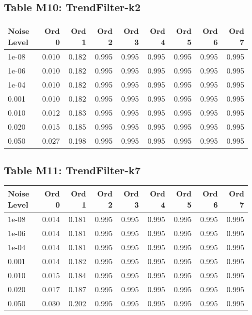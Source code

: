 \documentclass[10pt]{article}
\begin{document}
\clearpage

\subsection*{Table M10: TrendFilter-k2}

\begin{longtable}{lrrrrrrrr}
\toprule
\textbf{Noise Level} & \textbf{Ord 0} & \textbf{Ord 1} & \textbf{Ord 2} & \textbf{Ord 3} & \textbf{Ord 4} & \textbf{Ord 5} & \textbf{Ord 6} & \textbf{Ord 7} \\
\midrule
\endhead
1e-08 & 0.010 & 0.182 & 0.995 & 0.995 & 0.995 & 0.995 & 0.995 & 0.995 \\
1e-06 & 0.010 & 0.182 & 0.995 & 0.995 & 0.995 & 0.995 & 0.995 & 0.995 \\
1e-04 & 0.010 & 0.182 & 0.995 & 0.995 & 0.995 & 0.995 & 0.995 & 0.995 \\
0.001 & 0.010 & 0.182 & 0.995 & 0.995 & 0.995 & 0.995 & 0.995 & 0.995 \\
0.010 & 0.012 & 0.183 & 0.995 & 0.995 & 0.995 & 0.995 & 0.995 & 0.995 \\
0.020 & 0.015 & 0.185 & 0.995 & 0.995 & 0.995 & 0.995 & 0.995 & 0.995 \\
0.050 & 0.027 & 0.198 & 0.995 & 0.995 & 0.995 & 0.995 & 0.995 & 0.995 \\
\bottomrule
\end{longtable}

\clearpage

\subsection*{Table M11: TrendFilter-k7}

\begin{longtable}{lrrrrrrrr}
\toprule
\textbf{Noise Level} & \textbf{Ord 0} & \textbf{Ord 1} & \textbf{Ord 2} & \textbf{Ord 3} & \textbf{Ord 4} & \textbf{Ord 5} & \textbf{Ord 6} & \textbf{Ord 7} \\
\midrule
\endhead
1e-08 & 0.014 & 0.181 & 0.995 & 0.995 & 0.995 & 0.995 & 0.995 & 0.995 \\
1e-06 & 0.014 & 0.181 & 0.995 & 0.995 & 0.995 & 0.995 & 0.995 & 0.995 \\
1e-04 & 0.014 & 0.181 & 0.995 & 0.995 & 0.995 & 0.995 & 0.995 & 0.995 \\
0.001 & 0.014 & 0.182 & 0.995 & 0.995 & 0.995 & 0.995 & 0.995 & 0.995 \\
0.010 & 0.015 & 0.184 & 0.995 & 0.995 & 0.995 & 0.995 & 0.995 & 0.995 \\
0.020 & 0.017 & 0.187 & 0.995 & 0.995 & 0.995 & 0.995 & 0.995 & 0.995 \\
0.050 & 0.030 & 0.202 & 0.995 & 0.995 & 0.995 & 0.995 & 0.995 & 0.995 \\
\bottomrule
\end{longtable}
\end{document}
